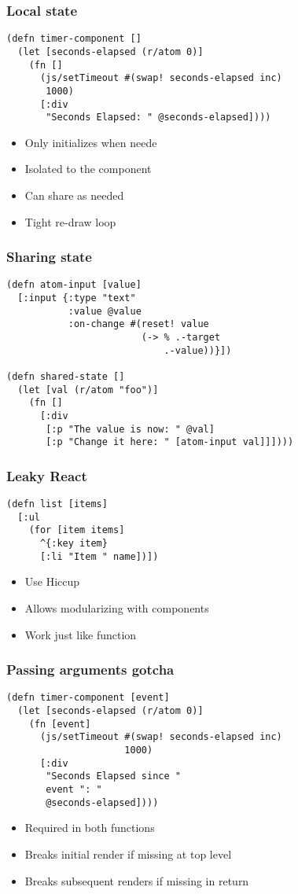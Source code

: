 \documentclass{beamer}
\begin{document}
  \begin{frame}[fragile]
    \frametitle{Local state}
    \begin{verbatim}
(defn timer-component []
  (let [seconds-elapsed (r/atom 0)]
    (fn []
      (js/setTimeout #(swap! seconds-elapsed inc)
       1000)
      [:div
       "Seconds Elapsed: " @seconds-elapsed])))
    \end{verbatim}
    \begin{itemize}
      \item Only initializes when neede
      \item Isolated to the component
      \item Can share as needed
      \item Tight re-draw loop
    \end{itemize}
  \end{frame}

  \begin{frame}[fragile]
    \frametitle{Sharing state}
    \begin{verbatim}
(defn atom-input [value]
  [:input {:type "text"
           :value @value
           :on-change #(reset! value
                        (-> % .-target
                            .-value))}])

(defn shared-state []
  (let [val (r/atom "foo")]
    (fn []
      [:div
       [:p "The value is now: " @val]
       [:p "Change it here: " [atom-input val]]])))
    \end{verbatim}
  \end{frame}

  \begin{frame}[fragile]
    \frametitle{Leaky React}
    \begin{verbatim}
(defn list [items]
  [:ul
    (for [item items]
      ^{:key item}
      [:li "Item " name])])
    \end{verbatim}
    \begin{itemize}
      \item Use Hiccup
      \item Allows modularizing with components
      \item Work just like function
    \end{itemize}
  \end{frame}

  \begin{frame}[fragile]
    \frametitle{Passing arguments gotcha}
    \begin{verbatim}
(defn timer-component [event]
  (let [seconds-elapsed (r/atom 0)]
    (fn [event]
      (js/setTimeout #(swap! seconds-elapsed inc)
                     1000)
      [:div
       "Seconds Elapsed since "
       event ": "
       @seconds-elapsed])))
    \end{verbatim}
    \begin{itemize}
      \item Required in both functions
      \item Breaks initial render if missing at top level
      \item Breaks subsequent renders if missing in return
    \end{itemize}
  \end{frame}
\end{document}
